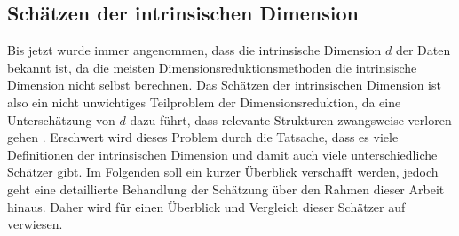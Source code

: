 \subsection{Schätzen der intrinsischen Dimension}
\label{ch:Vergleich:sec:Methodik:subsec:SchaetzenDerIntrinsischenDim}

Bis jetzt wurde immer angenommen, dass die intrinsische Dimension $d$ der Daten bekannt ist, da die
meisten Dimensionsreduktionsmethoden die intrinsische Dimension nicht selbst berechnen. Das
Schätzen der intrinsischen Dimension ist also ein nicht unwichtiges Teilproblem der
Dimensionsreduktion, da eine Unterschätzung von $d$ dazu führt, dass relevante Strukturen
zwangsweise verloren gehen \parencite[1]{Levina.2004}. Erschwert wird dieses Problem durch die Tatsache, dass es viele
Definitionen der intrinsischen Dimension und damit auch viele unterschiedliche Schätzer gibt. Im
Folgenden soll ein kurzer Überblick verschafft werden, jedoch geht eine detaillierte Behandlung der
Schätzung über den Rahmen dieser Arbeit hinaus. Daher wird für einen Überblick und Vergleich dieser
Schätzer auf \textcites{Campadelli.2015}{Bac.2021}{Verveer.1995} verwiesen.

